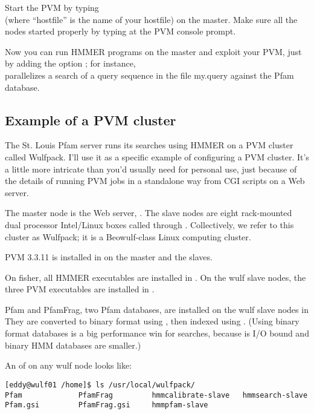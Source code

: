 Start the PVM by typing\\
(where ``hostfile'' is the
name of your hostfile) on the master. Make sure all the nodes started
properly by typing 
at the PVM console prompt.

Now you can run HMMER programs on the master and exploit your PVM,
just by adding the option ; for instance,\\
parallelizes a search of
a query sequence in the file my.query against the Pfam database.

\subsection{Example of a PVM cluster}

The St. Louis Pfam server runs its searches using HMMER on a PVM
cluster called Wulfpack. I'll use it as a specific example of
configuring a PVM cluster. It's a little more intricate than you'd
usually need for personal use, just because of the details of running
PVM jobs in a standalone way from CGI scripts on a Web server.

The master node is the Web server, .  The slave nodes are
eight rack-mounted dual processor Intel/Linux boxes called
 through . Collectively, we refer to
this cluster as Wulfpack; it is a Beowulf-class Linux computing
cluster.

PVM 3.3.11 is installed in  on the master and the
slaves. 

On fisher, all HMMER executables are installed in .  On
the wulf slave nodes, the three PVM executables are installed in
.

Pfam and PfamFrag, two Pfam databases, are installed on the wulf slave
nodes in  They are converted to binary
format using , then indexed using .
(Using binary format databases is a big performance win for
 searches, because  is I/O bound and  
binary HMM databases are smaller.)

An  of  on any wulf node looks like:
\begin{verbatim}
[eddy@wulf01 /home]$ ls /usr/local/wulfpack/
Pfam             PfamFrag         hmmcalibrate-slave   hmmsearch-slave
Pfam.gsi         PfamFrag.gsi     hmmpfam-slave
\end{verbatim}


